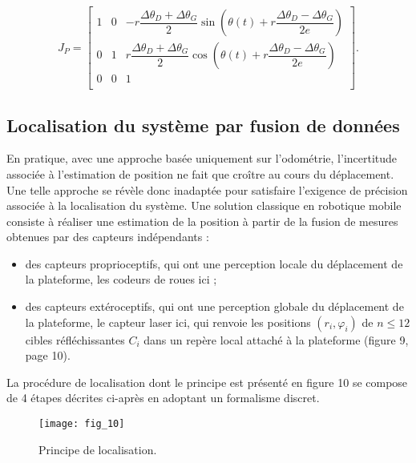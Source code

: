 $$
J_P = 
\begin{bmatrix}
1 	& 0	& -r \dfrac{\Delta \theta_D+\Delta \theta_G}{2} \sin \left(\theta(t) + r \dfrac{\Delta \theta_D-\Delta \theta_G}{2e}\right) \\
0 	& 1	& r \dfrac{\Delta \theta_D+\Delta \theta_G}{2} \cos \left(\theta(t) + r \dfrac{\Delta \theta_D-\Delta \theta_G}{2e}\right) \\
0 & 0 & 1 \\
\end{bmatrix}.
$$


\subsection*{Localisation du système par fusion de données}
En pratique, avec une approche basée uniquement sur l’odométrie, l’incertitude associée à l’estimation de position ne fait que croître au cours du déplacement. Une telle
approche se révèle donc inadaptée pour satisfaire l’exigence de précision associée à la localisation du système.
Une solution classique en robotique mobile consiste à
réaliser une estimation de la position à partir de la fusion
de mesures obtenues par des capteurs indépendants :
\begin{itemize}
\item des capteurs proprioceptifs, qui ont une perception locale du déplacement de la plateforme, les
codeurs de roues ici ;
\item des capteurs extéroceptifs, qui ont une perception globale du déplacement de la plateforme, le capteur laser ici, qui renvoie les positions $(r_i, \varphi_i)$ de $n \leq 12$ cibles réfléchissantes $C_i$ dans un repère local attaché à la plateforme (figure 9, page 10).
\end{itemize}

La procédure de localisation dont le principe est présenté en figure 10 se compose de 4 étapes
décrites ci-après en adoptant un formalisme discret.

\begin{figure}[!h]
\centering
\texttt{[image: fig\_10]}
\caption{\label{fig:10}  Principe de localisation.}
\end{figure}

